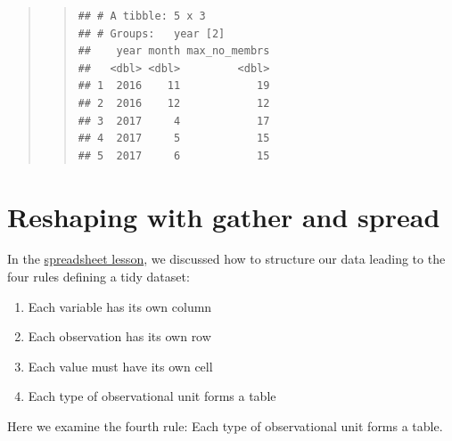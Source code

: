 \documentclass[]{book}
\newenvironment{Shaded}{\begin{snugshade}}{\end{snugshade}}
\newcommand{\KeywordTok}[1]{\textcolor[rgb]{0.13,0.29,0.53}{\textbf{#1}}}
\newcommand{\DataTypeTok}[1]{\textcolor[rgb]{0.13,0.29,0.53}{#1}}
\newcommand{\StringTok}[1]{\textcolor[rgb]{0.31,0.60,0.02}{#1}}
\newcommand{\CommentTok}[1]{\textcolor[rgb]{0.56,0.35,0.01}{\textit{#1}}}
\newcommand{\OperatorTok}[1]{\textcolor[rgb]{0.81,0.36,0.00}{\textbf{#1}}}
\newcommand{\NormalTok}[1]{#1}
\providecommand{\tightlist}{%
  \setlength{\itemsep}{0pt}\setlength{\parskip}{0pt}}
\begin{document}
\begin{quote}
\begin{quote}
\begin{Shaded}
\end{Shaded}

\begin{verbatim}
## # A tibble: 5 x 3
## # Groups:   year [2]
##    year month max_no_membrs
##   <dbl> <dbl>         <dbl>
## 1  2016    11            19
## 2  2016    12            12
## 3  2017     4            17
## 4  2017     5            15
## 5  2017     6            15
\end{verbatim}
\end{quote}
\end{quote}

\section{Reshaping with gather and
spread}\label{reshaping-with-gather-and-spread}

In the
\href{http://www.datacarpentry.org/spreadsheets-socialsci/}{spreadsheet
lesson}, we discussed how to structure our data leading to the four
rules defining a tidy dataset:

\begin{enumerate}
\def\labelenumi{\arabic{enumi}.}
\tightlist
\item
  Each variable has its own column
\item
  Each observation has its own row
\item
  Each value must have its own cell
\item
  Each type of observational unit forms a table
\end{enumerate}

Here we examine the fourth rule: Each type of observational unit forms a
table.
\end{document}
